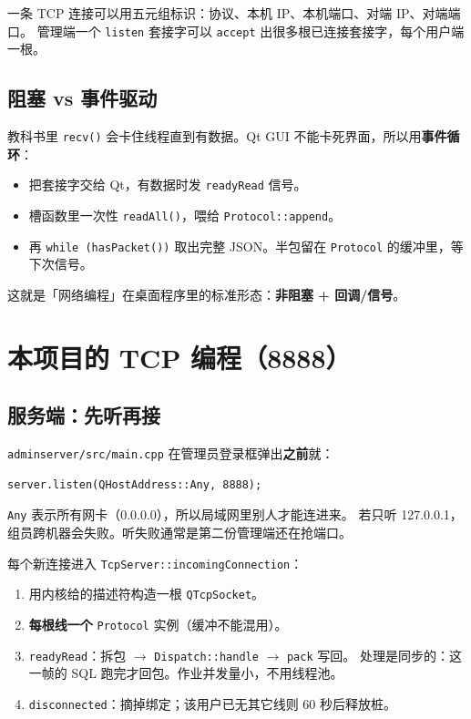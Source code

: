 \documentclass[UTF8,a4paper,11pt]{ctexart}
\begin{document}
一条 TCP 连接可以用五元组标识：协议、本机 IP、本机端口、对端 IP、对端端口。
管理端一个 \texttt{listen} 套接字可以 \texttt{accept} 出很多根已连接套接字，每个用户端一根。

\subsection{阻塞 vs 事件驱动}

教科书里 \texttt{recv()} 会卡住线程直到有数据。Qt GUI 不能卡死界面，所以用\textbf{事件循环}：

\begin{itemize}[leftmargin=1.4em]
  \item 把套接字交给 Qt，有数据时发 \texttt{readyRead} 信号。
  \item 槽函数里一次性 \texttt{readAll()}，喂给 \texttt{Protocol::append}。
  \item 再 \texttt{while (hasPacket())} 取出完整 JSON。半包留在 \texttt{Protocol} 的缓冲里，等下次信号。
\end{itemize}

这就是「网络编程」在桌面程序里的标准形态：\textbf{非阻塞 + 回调/信号}。

\section{本项目的 TCP 编程（8888）}

\subsection{服务端：先听再接}

\texttt{adminserver/src/main.cpp} 在管理员登录框弹出\textbf{之前}就：

\begin{lstlisting}
server.listen(QHostAddress::Any, 8888);
\end{lstlisting}

\texttt{Any} 表示所有网卡（0.0.0.0），所以局域网里别人才能连进来。
若只听 127.0.0.1，组员跨机器会失败。听失败通常是第二份管理端还在抢端口。

每个新连接进入 \texttt{TcpServer::incomingConnection}：

\begin{enumerate}[leftmargin=1.6em]
  \item 用内核给的描述符构造一根 \texttt{QTcpSocket}。
  \item \textbf{每根线一个} \texttt{Protocol} 实例（缓冲不能混用）。
  \item \texttt{readyRead}：拆包 $\to$ \texttt{Dispatch::handle} $\to$ \texttt{pack} 写回。
        处理是同步的：这一帧的 SQL 跑完才回包。作业并发量小，不用线程池。
  \item \texttt{disconnected}：摘掉绑定；该用户已无其它线则 60 秒后释放桩。
\end{enumerate}
\end{document}
